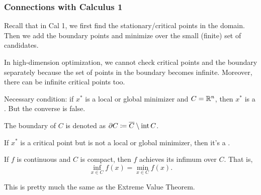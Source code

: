 \documentclass[class=article,crop=false]{standalone}
\begin{document}
\subsubsection{Connections with Calculus 1}
Recall that in Cal 1, we first find the stationary/critical points in the domain. Then we add the boundary points and minimize over the small (finite) set of candidates.

In high-dimension optimization, we cannot check critical points and the boundary separately because the set of points in the boundary becomes infinite. Moreover, there can be infinite critical points too.

Necessary condition: if $ x^* $ is a local or global minimizer and $ C = \mathbb{R}^{n}$, then $ x^* $ is a . But the converse is false.

\begin{notation}
	The boundary of $ C$ is denoted as  $ \partial C \coloneqq \overline{C} \setminus \operatorname{int} C$.
\end{notation}

If $ x^* $ is a critical point but is not a local or global minimizer, then it's a .

\begin{thm}[Weierstrass]
If $ f$ is continuous and  $ C$ is compact, then  $ f$ achieves its infimum over  $ C$. That is,
 \[
	 \inf_{x \in C} f(x) = \min_{x \in C} f(x)
.\] 
\end{thm}
\begin{note}
This is pretty much the same as the Extreme Value Theorem.
\end{note}
\end{document}
